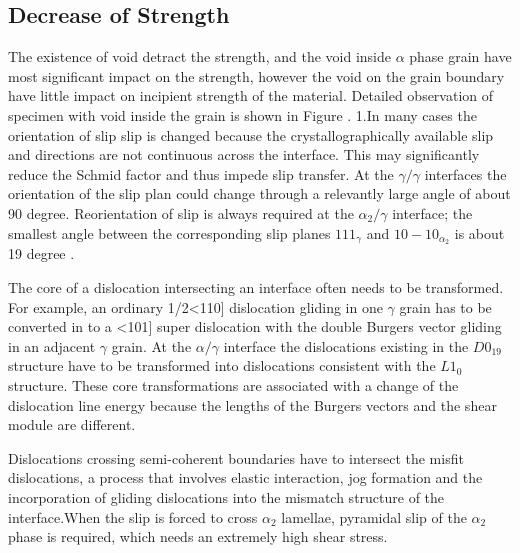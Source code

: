 \documentclass[preview,times]{elsarticle}
\begin{document}
\subsection{Decrease of Strength}

The existence of void detract the strength, and the void inside $\alpha$ phase grain have most significant  impact on the strength, however the void on the grain boundary have little impact on incipient strength of the material. Detailed observation of specimen with void inside the grain is shown in Figure \cite{}.
1.In many cases the orientation of slip slip is changed because the crystallographically available slip and directions are not continuous across the interface. This may significantly reduce the Schmid factor and thus impede slip transfer. At the $\gamma/\gamma$ interfaces the orientation of the slip plan could change through a relevantly large angle of about 90 degree. Reorientation of slip is always required at the $\alpha_{2}/\gamma$ interface; the smallest angle between the corresponding slip planes ${1 1 1 }_{\gamma}$ and ${ 1 0 -1 0}_{\alpha_2}$ is about 19 degree \cite{}.

The core of  a dislocation intersecting an interface often needs to be transformed. For example, an ordinary 1/2<110] dislocation gliding in one $\gamma$ grain has to be converted in to a <101] super dislocation with the double Burgers vector gliding in an adjacent $\gamma$ grain. At the $\alpha/\gamma$ interface the dislocations existing in the $D0_{19}$ structure have to be transformed into dislocations consistent with the $L1_0$structure. These core transformations are associated with a change of the dislocation line energy because the lengths of the Burgers vectors and the shear module are different.
 
Dislocations crossing semi-coherent boundaries have to intersect the misfit dislocations, a process that involves elastic interaction, jog formation and the incorporation of gliding dislocations into the mismatch structure of the interface.When the slip is forced to cross $\alpha_2$ lamellae, pyramidal slip of the $\alpha_2$ phase is required, which needs an extremely high shear stress.
\end{document}
